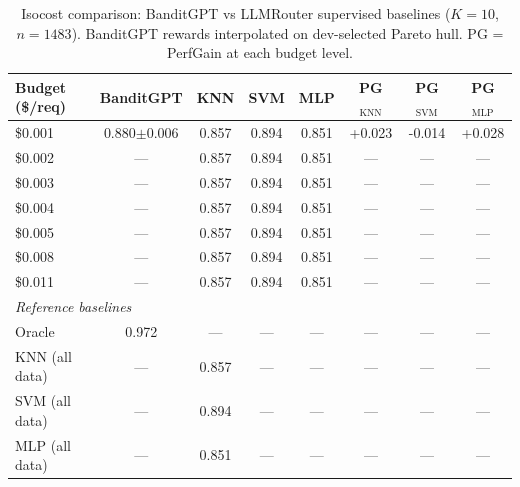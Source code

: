 \begin{table}[htbp]
\centering
\caption{Isocost comparison: BanditGPT vs LLMRouter supervised baselines ($K{=}10$, $n{=}1483$). BanditGPT rewards interpolated on dev-selected Pareto hull. PG = PerfGain at each budget level.}
\label{tab:isocost_k10}
\small
\begin{tabular}{lccccccc}
\toprule
Budget (\$/req) & BanditGPT & KNN & SVM & MLP & PG$_{\mathrm{KNN}}$ & PG$_{\mathrm{SVM}}$ & PG$_{\mathrm{MLP}}$ \\
\midrule
\$0.001 & 0.880$\pm$0.006 & 0.857 & 0.894 & 0.851 & +0.023 & -0.014 & +0.028 \\
\$0.002 & --- & 0.857 & 0.894 & 0.851 & --- & --- & --- \\
\$0.003 & --- & 0.857 & 0.894 & 0.851 & --- & --- & --- \\
\$0.004 & --- & 0.857 & 0.894 & 0.851 & --- & --- & --- \\
\$0.005 & --- & 0.857 & 0.894 & 0.851 & --- & --- & --- \\
\$0.008 & --- & 0.857 & 0.894 & 0.851 & --- & --- & --- \\
\$0.011 & --- & 0.857 & 0.894 & 0.851 & --- & --- & --- \\
\midrule
\multicolumn{8}{l}{\textit{Reference baselines}} \\
Oracle & 0.972 & --- & --- & --- & --- & --- & --- \\
KNN (all data) & --- & 0.857 & --- & --- & --- & --- & --- \\
SVM (all data) & --- & 0.894 & --- & --- & --- & --- & --- \\
MLP (all data) & --- & 0.851 & --- & --- & --- & --- & --- \\
\bottomrule
\end{tabular}
\end{table}
